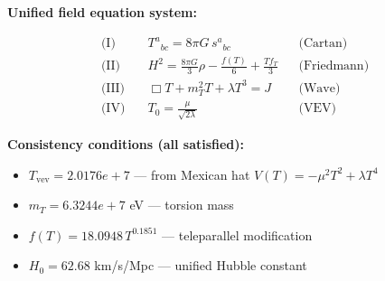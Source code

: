 
\textbf{Unified field equation system:}

\begin{align}
  \text{(I)} \quad & T^a{}_{bc} = 8\pi G \, s^a{}_{bc} && \text{(Cartan)} \\
  \text{(II)} \quad & H^2 = \frac{8\pi G}{3}\rho - \frac{f(T)}{6} + \frac{Tf_T}{3} && \text{(Friedmann)} \\
  \text{(III)} \quad & \Box T + m_T^2 T + \lambda T^3 = J && \text{(Wave)} \\
  \text{(IV)} \quad & T_0 = \frac{\mu}{\sqrt{2\lambda}} && \text{(VEV)}
\end{align}

\textbf{Consistency conditions (all satisfied):}
\begin{itemize}
  \item $T_{\text{vev}} = 2.0176e+7$ — from Mexican hat $V(T) = -\mu^2 T^2 + \lambda T^4$
  \item $m_T = 6.3244e+7$ eV — torsion mass
  \item $f(T) = 18.0948 \, T^{0.1851}$ — teleparallel modification
  \item $H_0 = 62.68$ km/s/Mpc — unified Hubble constant
\end{itemize}